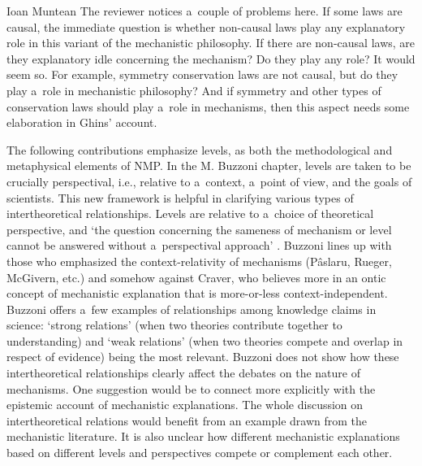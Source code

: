 \begin{recengenv}{Ioan Muntean}
\enlargethispage{1.5\baselineskip}
The reviewer notices a~couple of problems here. If some laws are causal, the immediate question is whether non-causal laws play any explanatory role in this variant of the mechanistic philosophy. If there are non-causal laws, are they explanatory idle concerning the mechanism? Do they play any role? It would seem so. For example, symmetry conservation laws are not causal, but do they play a~role in mechanistic philosophy? And if symmetry and other types of conservation laws should play a~role in mechanisms, then this aspect needs some elaboration in Ghins' account.

The following contributions emphasize levels, as both the methodological and metaphysical elements of NMP. In the M. Buzzoni chapter, levels are taken to be crucially perspectival, i.e., relative to a~context, a~point of view, and the goals of scientists. This new framework is helpful in clarifying various types of intertheoretical relationships. Levels are relative to a~choice of theoretical perspective, and ‘the question concerning the sameness of mechanism or level cannot be answered without a~perspectival approach'
\parencite*[][p.118]{falkenburg_mechanistic_2019}. %
 Buzzoni lines up with those who emphasized the context-relativity of mechanisms (Pâslaru, Rueger, McGivern, etc.) and somehow against Craver, who believes more in an ontic concept of mechanistic explanation that is more-or-less context-independent. Buzzoni offers a~few examples of relationships among knowledge claims in science: ‘strong relations' (when two theories contribute together to understanding) and ‘weak relations' (when two theories compete and overlap in respect of evidence) being the most relevant. Buzzoni does not show how these intertheoretical relationships clearly affect the debates on the nature of mechanisms. One suggestion would be to connect more explicitly with the epistemic account of mechanistic explanations. The whole discussion on intertheoretical relations would benefit from an example drawn from the mechanistic literature. It is also unclear how different mechanistic explanations based on different levels and perspectives compete or complement each other.


\end{recengenv}
